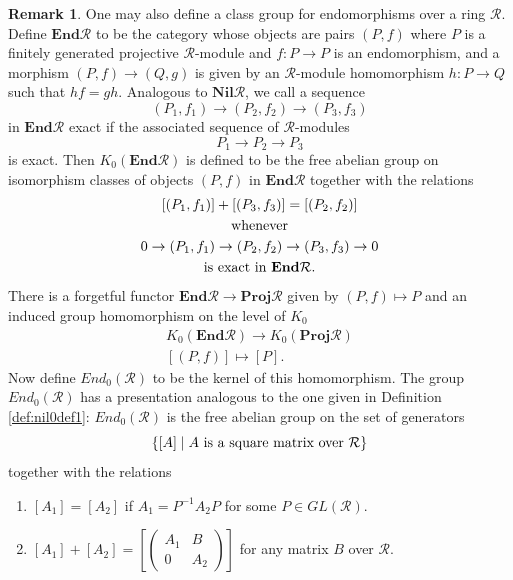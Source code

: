 \documentclass{amsart}
\theoremstyle{definition}
\newtheorem{rem}[equation]{Remark}
\theoremstyle{definition}
\newcommand{\calR}{\mathcal{R}}
\numberwithin{equation}{subsection}
\begin{document}
\begin{rem}\label{rem:ktheoryendomorphisms}
One may also define a class group for endomorphisms over a ring $\calR$. Define $\textbf{End}\calR$ to be the category whose objects are pairs $(P,f)$ where $P$ is a finitely generated projective $\calR$-module and $f \colon P \to P$ is an endomorphism, and a morphism $(P,f) \to (Q,g)$ is given by an $\calR$-module homomorphism $h \colon P \to Q$ such that $hf = gh$. Analogous to $\textbf{Nil}\calR$, we call a sequence
$$(P_{1},f_{1}) \to (P_{2},f_{2}) \to (P_{3},f_{3})$$
in $\textbf{End}\calR$ exact if the associated sequence of $\calR$-modules
$$P_{1} \to P_{2} \to P_{3}$$
is exact. Then $K_{0}(\textbf{End}\calR)$ is defined to be the free abelian group on isomorphism classes of objects $(P,f)$ in $\textbf{End}\calR$ together with the relations
\begin{equation}
\begin{gathered}
{[(P_{1},f_{1})]} + [(P_{3},f_{3})] = [(P_{2},f_{2})]\\
\textnormal{whenever}\\
0 \to (P_{1},f_{1}) \to (P_{2},f_{2}) \to (P_{3},f_{3}) \to 0\\
\textnormal{is exact in } \textbf{End}\calR.
\end{gathered}
\end{equation}
There is a forgetful functor $\textbf{End}\calR \to \textbf{Proj}\calR$ given by $(P,f) \mapsto P$ and an induced group homomorphism on the level of $K_{0}$
\begin{equation}
\begin{gathered}
K_{0}(\textbf{End}\calR) \to K_{0}(\textbf{Proj}\calR)\\
[(P,f)] \mapsto [P].
\end{gathered}
\end{equation}
Now define $End_{0}(\calR)$ to be the kernel of this homomorphism. The group $End_{0}(\calR)$ has a presentation analogous to the one given in Definition \ref{def:nil0def1}: $End_{0}(\calR)$ is the free abelian group on the set of generators
$$\{[A] \mid A \textnormal{ is a square matrix over } \calR\}$$
together with the relations
\begin{enumerate}
\item
$[A_{1}] = [A_{2}]$ if $A_{1} = P^{-1}A_{2}P$ for some $P \in GL(\calR)$.
\vspace{.07in}
\item
$[A_{1}] + [A_{2}] = \left[ \begin{pmatrix} A_{1} & B \\ 0 & A_{2} \end{pmatrix} \right]$ for any matrix $B$ over $\calR$.

\end{enumerate}
\end{rem}
\end{document}
